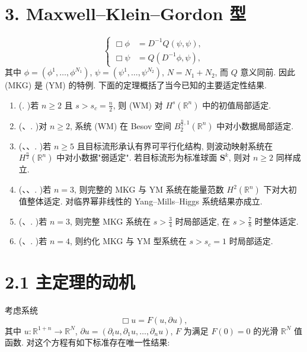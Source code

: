 \section*{3. Maxwell--Klein--Gordon 型}

\begin{equation}
\left\{\begin{aligned}\Box\phi&=D^{-1}Q(\psi,\psi),\\ \Box\psi&=Q(D^{-1}\phi,\psi),\end{aligned}\right.\end{equation}
其中 $\phi = (\phi^1, \ldots, \phi^{N_1})$, $\psi = (\psi^1, \ldots, \psi^{N_2})$, $N = N_1 + N_2$, 而 $Q$ 意义同前. 因此 (MKG) 是 (YM) 的特例.
下面的定理概括了当今已知的主要适定性结果.
\begin{theorem*}[主定理]
\begin{enumerate}[label=\roman*.]
\item (\cite{klai35,klai44}. )若 $n \geq 2$ 且 $s > s_c = \frac{n}{2}$, 则 (WM) 对 $H^s(\mathbb{R}^n)$ 中的初值局部适定.
\item (\cite{klai72}、\cite{klai73}. )对 $n \geq 2$, 系统 (WM) 在 Besov 空间 $B_{2}^{\frac{n}{2},1}(\mathbb{R}^{n})$ 中对小数据局部适定.
\item (\cite{klai70}、\cite{klai41}、\cite{klai71}. )若 $n \geq 5$ 且目标流形承认有界可平行化结构, 则波动映射系统在 $H^{\frac{n}{2}}(\mathbb{R}^{n})$ 中对小数据"弱适定". 若目标流形为标准球面 $\mathbf{S}^{k}$, 则对 $n \geq 2$ 同样成立.
\item (\cite{klai33}、\cite{klai34}、\cite{klai19}. )若 $n = 3$, 则完整的 MKG 与 YM 系统在能量范数 $H^{2}(\mathbb{R}^{n})$ 下对大初值整体适定. 对临界幂非线性的 Yang--Mills--Higgs 系统结果亦成立.
\item (\cite{klai13}、\cite{klai21}. )若 $n = 3$, 则完整 MKG 系统在 $s > \frac{3}{4}$ 时局部适定, 在 $s > \frac{7}{8}$ 时整体适定.
\item (\cite{klai39}、\cite{klai47}. )若 $n = 4$, 则约化 MKG 与 YM 型系统在 $s > s_c = 1$ 时局部适定.\end{enumerate}
\end{theorem*}

\section*{2.1 主定理的动机}

考虑系统
\begin{equation}
\Box u=F(u,\partial u),\end{equation}
其中 $u : \mathbb{R}^{1+n} \to \mathbb{R}^N$, $\partial u = (\partial_t u, \partial_1 u, \ldots, \partial_n u)$, $F$ 为满足 $F(0) = 0$ 的光滑 $\mathbb{R}^N$ 值函数. 对这个方程有如下标准存在唯一性结果:
\setcounter{mtthm}{1}%


